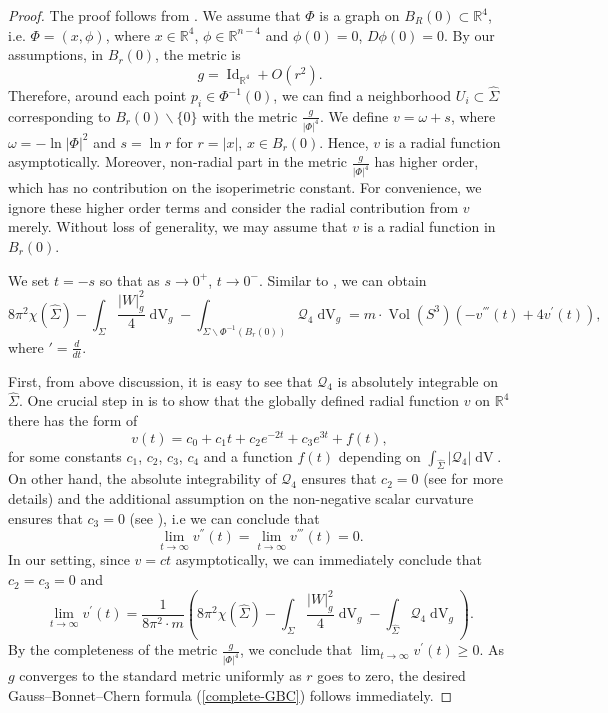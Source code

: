 \documentclass[11pt,letterpaper]{amsart}
\DeclareMathOperator{\Id}{Id}
\DeclareMathOperator{\Vol}{Vol}
\DeclareMathOperator{\dvol}{dV}
\newcommand{\mQ}{\mathcal{Q}}
\newcommand{\bR}{\mathbb{R}}
\theoremstyle{definition}
\theoremstyle{remark}
\numberwithin{equation}{section}
\begin{document}
\begin{proof}
    The proof follows from \cite[Section 2]{Chang-Qing-Yang00}. We assume that $\Phi$ is a graph on $B_R(0)\subset \bR^4$, i.e. $\Phi=(x, \phi)$, where $x\in \bR^4$, $\phi\in \bR^{n-4}$ and $\phi(0)=0$, $D\phi(0)=0$. By our assumptions, in $B_{r}(0)$, the metric is
\begin{equation*}
    g=\Id_{\bR^4}+O(r^2).
\end{equation*}
Therefore, around each point $p_i\in \Phi^{-1}(0)$, we can find a neighborhood $U_i\subset \hat{\Sigma}$ corresponding to $B_r(0)\backslash \{0\}$ with the metric $\frac{g}{|\Phi|^4}$. We define $v=\omega+s$, where $\omega=-\ln |\Phi|^2$ and $s=\ln r$ for $r=|x|$, $x\in B_r(0)$. Hence, $v$ is a radial function asymptotically. Moreover, non-radial part in the metric $\frac{g}{|\Phi|^4}$ has higher order, which has no contribution on the isoperimetric constant. For convenience, we ignore these higher order terms and consider the radial contribution from $v$ merely. Without loss of generality, we may assume that $v$ is a radial function in $B_r(0)$.

We set $t=-s$ so that as $s\to 0^{+}$, $t\to 0^{-}$. Similar to \cite[(2.16)]{Chang-Qing-Yang00}, we can obtain
\begin{equation}
    8\pi^2\chi(\hat{\Sigma})-\int_{\Sigma}\frac{|W|^2_g}{4}\dvol_g-\int_{\Sigma\backslash \Phi^{-1}(B_r(0))}\mQ_4 \dvol_g=m\cdot \Vol(S^3)\left(-v^{'''}(t)+4v^{'}(t)\right),
\end{equation}
where $'=\frac{d}{dt}$.

First, from above discussion, it is easy to see that $\mQ_4$ is absolutely integrable on $\hat{\Sigma}$. One crucial step in \cite[Section 2]{Chang-Qing-Yang00} is to show that the globally defined radial function $v$ on $\bR^4$ there has the form of
\begin{equation*}
    v(t)=c_0+c_1t+c_2e^{-2t}+c_3e^{3t}+f(t),
\end{equation*}
for some constants $c_1$, $c_2$, $c_3$, $c_4$ and a function $f(t)$ depending on $\int_{\hat{\Sigma}}|\mQ_4|\dvol$. On other hand, the absolute integrability of $\mQ_4$ ensures that $c_2=0$ (see \cite[Lemma 2.3]{Chang-Qing-Yang00} for more details) and the additional assumption on the non-negative scalar curvature ensures that $c_3=0$ (see \cite[Lemma 2.5]{Chang-Qing-Yang00}), i.e we can conclude that
\begin{equation*}
    \lim_{t\to \infty}v^{''}(t)=\lim_{t\to \infty}v^{'''}(t)=0.
\end{equation*}
In our setting, since $v=ct$ asymptotically, we can immediately conclude that $c_2=c_3=0$ and
\begin{equation*}
    \lim_{t\to \infty} v^{'}(t)=\frac{1}{8\pi^2\cdot m}\left(8\pi^2\chi(\hat{\Sigma})-\int_{\Sigma}\frac{|W|^2_g}{4}\dvol_g-\int_{\hat{\Sigma}}\mQ_4 \dvol_g\right).
\end{equation*}
By the completeness of the metric $\frac{g}{|\Phi|^4}$, we conclude that $\lim_{t\to \infty} v^{'}(t)\geq 0$. As $g$ converges to the standard metric uniformly as $r$ goes to zero, the desired Gauss--Bonnet--Chern formula (\ref{complete-GBC}) follows immediately.
\end{proof}
\end{document}
